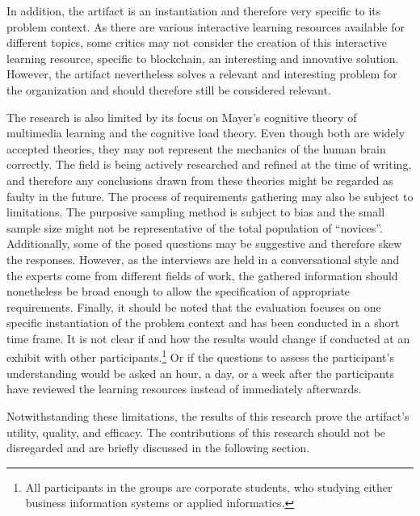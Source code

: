 In addition, the artifact is an instantiation and therefore very specific to its problem context. As there are various interactive learning resources available for different topics, some critics may not consider the creation of this interactive learning resource, specific to blockchain, an interesting and innovative solution. However, the artifact nevertheless solves a relevant and interesting problem for the organization and should therefore still be considered relevant. 

The research is also limited by its focus on Mayer's cognitive theory of multimedia learning and the cognitive load theory. Even though both are widely accepted theories, they may not represent the mechanics of the human brain correctly. The field is being actively researched and refined at the time of writing, and therefore any conclusions drawn from these theories might be regarded as faulty in the future. The process of requirements gathering may also be subject to limitations. The purposive sampling method is subject to bias and the small sample size might not be representative of the total population of \enquote{novices}. Additionally, some of the posed questions may be suggestive and therefore skew the responses. However, as the interviews are held in a conversational style and the experts come from different fields of work, the gathered information should nonetheless be broad enough to allow the specification of appropriate requirements. Finally, it should be noted that the evaluation focuses on one specific instantiation of the problem context and has been conducted in a short time frame. It is not clear if and how the results would change if conducted at an exhibit with other participants.\footnote{All participants in the groups are corporate students, who studying either business information systems or applied informatics.} Or if the questions to assess the participant's understanding would be asked an hour, a day, or a week after the participants have reviewed the learning resources instead of immediately afterwards.

Notwithstanding these limitations, the results of this research prove the artifact's utility, quality, and efficacy. The contributions of this research should not be disregarded and are briefly discussed in the following section. 


